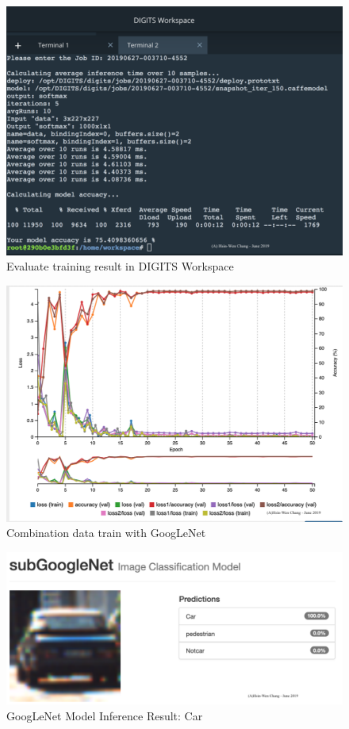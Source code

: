 \documentclass[10pt,journal,compsoc]{IEEEtran}
\begin{document}
\begin{figure}[thpb]
      \centering
      \includegraphics[width=\linewidth]{evaluate.png}
      \caption{Evaluate training result in DIGITS Workspace}
      \label{fig:robot1}
\end{figure}
\begin{figure}[thpb]
      \centering
      \includegraphics[width=\linewidth]{GoogLeNET.png}
      \caption{Combination data train with GoogLeNet}
      \label{fig:robot1}
\end{figure}
\begin{figure}[thpb]
      \centering
      \includegraphics[width=\linewidth]{CarInferenceResult.png}
      \caption{GoogLeNet Model Inference Result: Car}
      \label{fig:robot1}
\end{figure}
\end{document}
